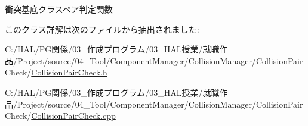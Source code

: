 衝突基底クラスペア判定関数 



このクラス詳解は次のファイルから抽出されました\+:\begin{DoxyCompactItemize}
\item 
C\+:/\+H\+A\+L/\+P\+G関係/03\+\_\+作成プログラム/03\+\_\+\+H\+A\+L授業/就職作品/\+Project/source/04\+\_\+\+Tool/\+Component\+Manager/\+Collision\+Manager/\+Collision\+Pair\+Check/\mbox{\hyperlink{_collision_pair_check_8h}{Collision\+Pair\+Check.\+h}}\item 
C\+:/\+H\+A\+L/\+P\+G関係/03\+\_\+作成プログラム/03\+\_\+\+H\+A\+L授業/就職作品/\+Project/source/04\+\_\+\+Tool/\+Component\+Manager/\+Collision\+Manager/\+Collision\+Pair\+Check/\mbox{\hyperlink{_collision_pair_check_8cpp}{Collision\+Pair\+Check.\+cpp}}\end{DoxyCompactItemize}
